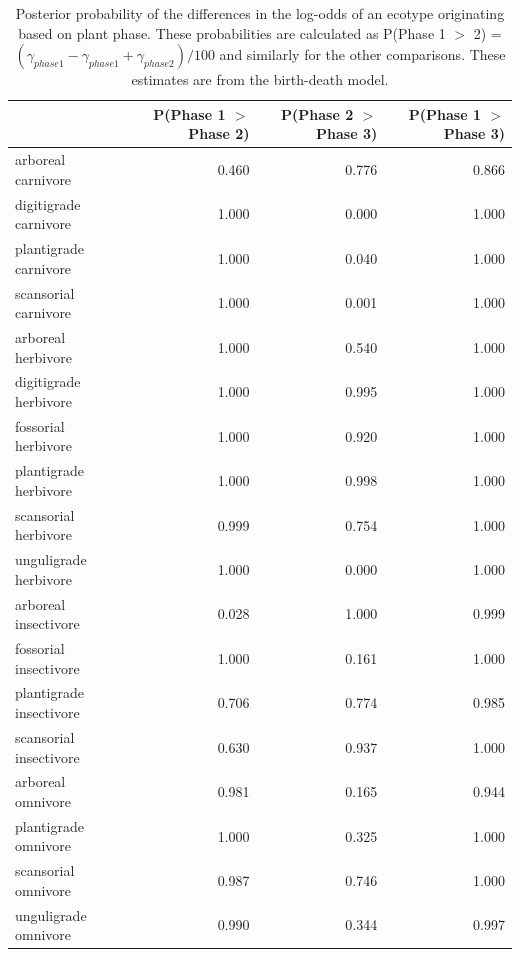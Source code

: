 \documentclass[12pt,letterpaper]{article}
\begin{document}
\begin{table}[ht]
  \centering
  \caption[Posterior probablity estimates of differences in origination by plant phase]{Posterior probability of the differences in the log-odds of an ecotype originating based on plant phase. These probabilities are calculated as P(Phase 1 \(>\) 2) = \( (\gamma_{phase 1} - \gamma_{phase 1} + \gamma_{phase 2}) / 100\) and similarly for the other comparisons. These estimates are from the birth-death model.}
  \label{tab:origin_plant}
  \begin{tabular}{ l r r r }
    \hline
    & P(Phase 1 $>$ Phase 2) & P(Phase 2 $>$ Phase 3) & P(Phase 1 $>$ Phase 3) \\ 
    \hline
    arboreal carnivore & 0.460 & 0.776 & 0.866 \\ 
    digitigrade carnivore & 1.000 & 0.000 & 1.000 \\ 
    plantigrade carnivore & 1.000 & 0.040 & 1.000 \\ 
    scansorial carnivore & 1.000 & 0.001 & 1.000 \\ 
    arboreal herbivore & 1.000 & 0.540 & 1.000 \\ 
    digitigrade herbivore & 1.000 & 0.995 & 1.000 \\ 
    fossorial herbivore & 1.000 & 0.920 & 1.000 \\ 
    plantigrade herbivore & 1.000 & 0.998 & 1.000 \\ 
    scansorial herbivore & 0.999 & 0.754 & 1.000 \\ 
    unguligrade herbivore & 1.000 & 0.000 & 1.000 \\ 
    arboreal insectivore & 0.028 & 1.000 & 0.999 \\ 
    fossorial insectivore & 1.000 & 0.161 & 1.000 \\ 
    plantigrade insectivore & 0.706 & 0.774 & 0.985 \\ 
    scansorial insectivore & 0.630 & 0.937 & 1.000 \\ 
    arboreal omnivore & 0.981 & 0.165 & 0.944 \\ 
    plantigrade omnivore & 1.000 & 0.325 & 1.000 \\ 
    scansorial omnivore & 0.987 & 0.746 & 1.000 \\ 
    unguligrade omnivore & 0.990 & 0.344 & 0.997 \\ 
    \hline
  \end{tabular}
\end{table}
\end{document}
